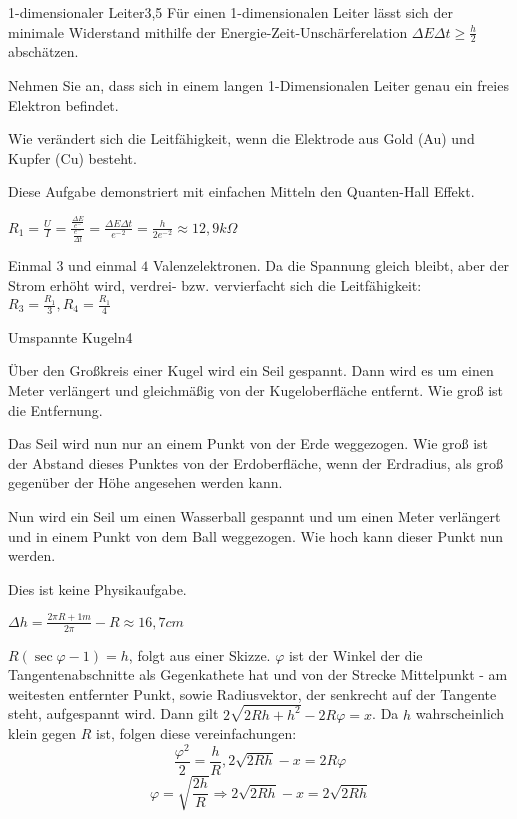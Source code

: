 \begin{problem}{1-dimensionaler Leiter}{3,5}
Für einen 1-dimensionalen Leiter lässt sich der minimale Widerstand mithilfe der Energie-Zeit-Unschärferelation $\Delta E\Delta t \geq \frac h2$ abschätzen.
\begin{abcenum}
 \item Nehmen Sie an, dass sich in einem langen 1-Dimensionalen Leiter genau ein freies Elektron befindet.
 \item Wie verändert sich die Leitfähigkeit, wenn die Elektrode aus Gold (Au) und Kupfer (Cu) besteht.
\end{abcenum}
Diese Aufgabe demonstriert mit einfachen Mitteln den Quanten-Hall Effekt.
\begin{solution}
\begin{abcenum}
  \item $R_1=\frac UI=\frac{\frac{\Delta E}{e^-}}{\frac{e^-}{\Delta t}}=\frac{\Delta E \Delta t}{{e^-}^2}=\frac{h}{2{e^-}^2}\approx 12,9\unit{k\Omega}$
  \item Einmal $3$ und einmal $4$ Valenzelektronen. Da die Spannung gleich bleibt, aber der Strom erhöht wird, verdrei- bzw. vervierfacht sich die Leitfähigkeit: $R_3=\frac {R_1}3, R_4=\frac{R_1}4$
\end{abcenum}
\end{solution}
\end{problem}

\begin{problem}{Umspannte Kugeln}{4}
\begin{abcenum}
 \item Über den Großkreis einer Kugel wird ein Seil gespannt. Dann wird es um einen Meter verlängert und gleichmäßig von der Kugeloberfläche entfernt. Wie groß ist die Entfernung.
 \item Das Seil wird nun nur an einem Punkt von der Erde weggezogen. Wie groß ist der Abstand dieses Punktes von der Erdoberfläche, wenn der Erdradius, als groß gegenüber der Höhe angesehen werden kann.
 \item Nun wird ein Seil um einen Wasserball gespannt und um einen Meter verlängert und in einem Punkt von dem Ball weggezogen. Wie hoch kann dieser Punkt nun werden.
\end{abcenum}
\begin{solution}
Dies ist keine Physikaufgabe.
\begin{abcenum}
\item $\Delta h = \frac{2\pi R+1m}{2\pi}-R\approx 16,7\unit{cm}$
\item $R(\sec{\varphi}-1)=h$, folgt aus einer Skizze. $\varphi$ ist der Winkel der die Tangentenabschnitte als Gegenkathete hat und von der Strecke Mittelpunkt - am weitesten entfernter Punkt, sowie Radiusvektor, der senkrecht auf der Tangente steht, aufgespannt wird. Dann gilt $2\sqrt{2Rh+h^2}-2R\varphi=x$. Da $h$ wahrscheinlich klein gegen $R$ ist, folgen diese vereinfachungen:
$$\frac{\varphi^2}2=\frac hR, 2\sqrt{2Rh}-x=2R\varphi$$
$$\varphi=\sqrt{\frac{2h}R} \Rightarrow 2\sqrt{2Rh}-x=2\sqrt{2Rh}$$
\end{abcenum}
\end{solution}
\end{problem}

